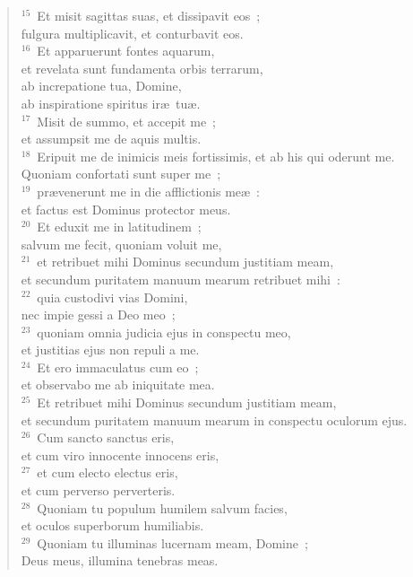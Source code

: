 \begin{flushleft}
\begin{verse}
${}^{15}$~Et misit sagittas suas, et dissipavit eos~;\\ fulgura multiplicavit, et conturbavit eos.\\
${}^{16}$~Et apparuerunt fontes aquarum,\\ et revelata sunt fundamenta orbis terrarum,\\ ab increpatione tua, Domine,\\ ab inspiratione spiritus ir\ae\ tu\ae .\\
${}^{17}$~Misit de summo, et accepit me~;\\ et assumpsit me de aquis multis.\\
${}^{18}$~Eripuit me de inimicis meis fortissimis, et ab his qui oderunt me.\\ Quoniam confortati sunt super me~;\\
${}^{19}$~pr\ae venerunt me in die afflictionis me\ae~:\\ et factus est Dominus protector meus.\\
${}^{20}$~Et eduxit me in latitudinem~;\\ salvum me fecit, quoniam voluit me,\\
${}^{21}$~et retribuet mihi Dominus secundum justitiam meam,\\ et secundum puritatem manuum mearum retribuet mihi~:\\
${}^{22}$~quia custodivi vias Domini,\\ nec impie gessi a Deo meo~;\\
${}^{23}$~quoniam omnia judicia ejus in conspectu meo,\\ et justitias ejus non repuli a me.\\
${}^{24}$~Et ero immaculatus cum eo~;\\ et observabo me ab iniquitate mea.\\
${}^{25}$~Et retribuet mihi Dominus secundum justitiam meam,\\ et secundum puritatem manuum mearum in conspectu oculorum ejus.\\
${}^{26}$~Cum sancto sanctus eris,\\ et cum viro innocente innocens eris,\\
${}^{27}$~et cum electo electus eris,\\ et cum perverso perverteris.\\
${}^{28}$~Quoniam tu populum humilem salvum facies,\\ et oculos superborum humiliabis.\\
${}^{29}$~Quoniam tu illuminas lucernam meam, Domine~;\\ Deus meus, illumina tenebras meas.\\

\end{verse}
\end{flushleft}
